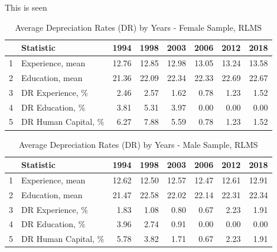 \documentclass[12pt,a4paper]{article}
\numberwithin{equation}{section}
\begin{document}
 This is seen

\begin{table}[h!]
	\centering
	\caption{Average Depreciation Rates (DR) by Years - Female Sample, RLMS}
	\label{tab:2.2}
	\begin{tabular}{@{\extracolsep{20pt}}rlrrrrrr}
		\hline
		& \textbf{Statistic} & \textbf{1994} & \textbf{1998} & \textbf{2003} & \textbf{2006} & \textbf{2012} & \textbf{2018} \\ 
		\hline
  1 & Experience, mean & 12.76 & 12.85 & 12.98 & 13.05 & 13.24 & 13.58 \\ 
  2 & Education, mean & 21.36 & 22.09 & 22.34 & 22.33 & 22.69 & 22.67 \\ 
  3 & DR Experience, \% & 2.46 & 2.57 & 1.62 & 0.78 & 1.23 & 1.52 \\ 
  4 & DR Education, \% & 3.81 & 5.31 & 3.97 & 0.00 & 0.00 & 0.00 \\ 
  5 & DR Human Capital, \% & 6.27 & 7.88 & 5.59 & 0.78 & 1.23 & 1.52 \\ 
   \hline
\end{tabular}
\end{table}

\begin{table}[ht]
	\centering
	\caption{Average Depreciation Rates (DR) by Years - Male Sample, RLMS}
	\label{tab:2.4}
	\begin{tabular}{@{\extracolsep{20pt}}rlrrrrrr}
		\hline
		& \textbf{Statistic} & \textbf{1994} & \textbf{1998} & \textbf{2003} & \textbf{2006} & \textbf{2012} & \textbf{2018} \\ 
  \hline
1 & Experience, mean & 12.62 & 12.50 & 12.57 & 12.47 & 12.61 & 12.91 \\ 
  2 & Education, mean & 21.47 & 22.58 & 22.02 & 22.14 & 22.31 & 22.34 \\ 
  3 & DR Experience, \% & 1.83 & 1.08 & 0.80 & 0.67 & 2.23 & 1.91 \\ 
  4 & DR Education, \% & 3.96 & 2.74 & 0.91 & 0.00 & 0.00 & 0.00 \\ 
  5 & DR Human Capital, \% & 5.78 & 3.82 & 1.71 & 0.67 & 2.23 & 1.91 \\ 
   \hline
\end{tabular}
\end{table}
\end{document}

